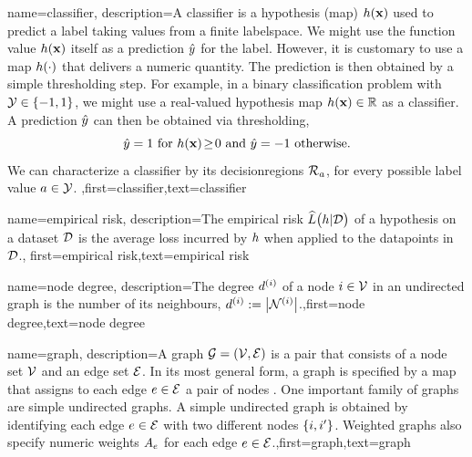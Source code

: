 {
	name={classifier},
	description={A classifier is a \gls{hypothesis} (map) $h({\bf x})$ 
		used to predict a \gls{label} taking values from a finite \gls{labelspace}. We might use the 
		function value $h({\bf x})$ itself as a \gls{prediction} $\hat{y}$ for 
		the \gls{label}. However, it is customary to use a map $h(\cdot)$ that delivers 
		a numeric quantity. The \gls{prediction} is then obtained by a simple thresholding step. 
		For example, in a binary \gls{classification} problem with \label{labelspace} $\mathcal{Y} \in  \{ -1,1\}$, 
		we might use a real-valued \gls{hypothesis} map $h({\bf x}) \in \mathbb{R}$ 
		as a classifier. A \gls{prediction} $\hat{y}$ can then be obtained via thresholding,  
		 \begin{equation} 
		 	\label{equ_def_threshold_bin_classifier}
		 	\hat{y} =1   \mbox{ for } h({\bf x})\!\geq\!0 \mbox{ and } 	\hat{y} =-1  \mbox{ otherwise.}
	 		\end{equation}
 		We can characterize a classifier by its \gls{decisionregion}s $\mathcal{R}_{a}$, for 
 		every possible \gls{label} value $a \in \mathcal{Y}$. },first={classifier},text={classifier} 
}

{name={empirical risk},
  description={The empirical risk $\widehat{L}\big(h|\mathcal{D}\big)$ 
  	of a \gls{hypothesis} on a \gls{dataset} $\mathcal{D}$ is the average \gls{loss} incurred 
  	by $h$ when applied to the \gls{datapoint}s in $\mathcal{D}$.},
  first={empirical risk},text={empirical risk} 
}

{name={node degree},
	description={The degree $d^{(i)}$ of a node $i \in \mathcal{V}$ 
		in an undirected \gls{graph} is the number of its \gls{neighbours}, $d^{(i)} := \big|\mathcal{N}^{(i)}\big|$.},first={node degree},text={node degree} 
}

{name={graph},
	description={A graph $\mathcal{G} = \left( \mathcal{V},\mathcal{E} \right)$ is a pair that consists of 
		a node set $\mathcal{V}$ and an edge set $\mathcal{E}$. In its most general form, a graph is 
		specified by a map that assigns to each edge $e \in \mathcal{E}$ a pair of nodes \cite{RockNetworks}. 
		One important family of graphs are simple undirected graphs. A simple undirected graph 
		is obtained by identifying each edge $e \in \mathcal{E}$ with two different nodes $\{i,i'\}$. 
		Weighted graphs also specify numeric weights $A_{e}$ for each 
		edge $e \in \mathcal{E}$.},first={graph},text={graph} 
}


